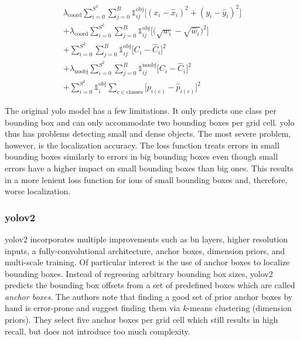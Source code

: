 \documentclass[draft,final]{vutinfth} %
\begin{document}
\begin{multline}
  \label{eq:yolo-loss}
  \lambda_{\mathrm{coord}}\sum_{i=0}^{S^{2}}\sum_{j=0}^{B}\mathds{1}_{ij}^{\mathrm{obj}}\biggl[ (x_{i} - \hat{x}_{i})^{2} + (y_{i} - \hat{y}_{i})^{2} \biggr] \\
  + \lambda_{\mathrm{coord}}\sum_{i=0}^{S^{2}}\sum_{j=0}^{B}\mathds{1}_{ij}^{\mathrm{obj}}\biggl[ \biggl(\sqrt{w_{i}} - \sqrt{\hat{w}_{i}}\biggr)^{2} \biggr] \\
  + \sum_{i=0}^{S^{2}}\sum_{j=0}^{B}\mathds{1}_{ij}^{\mathrm{obj}}\biggl[ C_{i} - \hat{C}_{i} \biggr]^{2} \\
  + \lambda_{\mathrm{noobj}}\sum_{i=0}^{S^{2}}\sum_{j=0}^{B}\mathds{1}_{ij}^{\mathrm{noobj}}\biggl[ C_{i} - \hat{C}_{i} \biggr]^{2} \\
  + \sum_{i=0}^{S^{2}}\mathds{1}_{i}^{\mathrm{obj}}\sum_{c\in\mathrm{classes}}\biggl[ p_{i(c)} - \hat{p}_{i(c)} \biggr]^{2}
\end{multline}

The original \gls{yolo} model has a few limitations. It only predicts
one class per bounding box and can only accommodate two bounding boxes
per grid cell. \gls{yolo} thus has problems detecting small and dense
objects. The most severe problem, however, is the localization
accuracy. The loss function treats errors in small bounding boxes
similarly to errors in big bounding boxes even though small errors
have a higher impact on small bounding boxes than big ones. This
results in a more lenient loss function for \glspl{iou} of small
bounding boxes and, therefore, worse localization.

\subsubsection{\gls{yolo}v2}
\label{sssec:yolov2}

\gls{yolo}v2 \cite{redmon2017} incorporates multiple improvements such
as \gls{bn} layers, higher resolution inputs, a fully-convolutional
architecture, anchor boxes, dimension priors, and multi-scale
training. Of particular interest is the use of anchor boxes to
localize bounding boxes. Instead of regressing arbitrary bounding box
sizes, \gls{yolo}v2 predicts the bounding box offsets from a set of
predefined boxes which are called \emph{anchor boxes}. The authors
note that finding a good set of prior anchor boxes by hand is
error-prone and suggest finding them via $k$-means clustering
(dimension priors). They select five anchor boxes per grid cell which
still results in high recall, but does not introduce too much
complexity.
\end{document}
